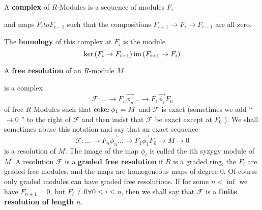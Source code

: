 \documentclass{article}
\begin{document}
% 



\begin{defn}

A \textbf{complex} of \(R\)-Modules is a sequence of modules \( F_{i} \)


and maps \( F_{i} to F_{i-1} \) such that the compositions \( F_{i+1} \to F_{i} \to F_{i-1} \) are all zero.


The \textbf{homology} of this complex at \( F_{i} \) is the module 
\[
	\ker \left( F_{i} \to F_{i-1} \right)   \/ \operatorname{im} \left( F_{i+1} \to F_{i} \right)
\]


A \textbf{free resolution} of an \( R\)-module \( M \)


is a complex
\[
	\mathcal{F}: \hdots \to F_{n} \overset{\to}{\phi_{n}} 
	\hdots \to F_{1} \overset{\to}{\phi_{1}} F_{0}
\]
of free \(R\)-Modules such that \( \operatorname{coker} \phi_{1} = M \) 
and \( \mathcal{F} \)  is exact (sometimes we add `` \( \to 0 \) '' to the right of \(\mathcal{F}\) and then insist that \(\mathcal{F}\) be exact except at \( F_{0} \) ).
We shall sometimes abuse this notation and say that an exact sequence 
\[
	\mathcal{F}: \hdots \to F_{n} \overset{\to}{\phi_{n}} 
	\hdots \to F_{1} \overset{\to}{\phi_{1}} F_{0}
	\to M \to 0
\]
is a resolution of \( M \).  
The image of the map \( \phi_i \) is called the ith syzygy module of \(M \).
A resolution \( \mathcal{F }\) is a \textbf{graded free resolution } if \( R \) is a graded ring, the \(  F_{i}\) are graded free modules, and the maps are homogeneous maps of degree 0.
Of course only graded modules can have graded free resolutions.
If for some \( n < \inf \) we have \( F_{n+1}=0 \), 
but \( F_{i} \neq 0 \forall 0 \le i \le n \), then we shall say that 
\( \mathcal{F}\) is a \textbf{finite resolution of length} \( n\).
\end{defn}
\end{document}
